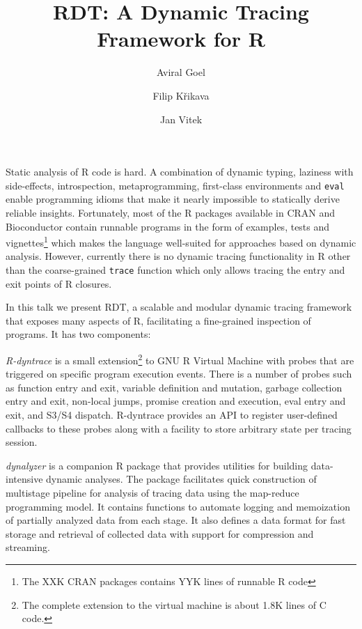 \documentclass[acmsmall,review]{acmart}
\title{RDT: A Dynamic Tracing Framework for R}
\author{Aviral Goel}
\affiliation{
  \institution{Northeastern University}
  \country{USA}
}
\author{Filip Křikava}
\affiliation{
  \institution{Czech Technical University}
  \country{Czechia}
}
\author{Jan Vitek}
\affiliation{
  \institution{Northeastern University}
  \country{USA}
}
\affiliation{
  \institution{Czech Technical University}
  \country{Czechia}
}
\newcommand{\code}[1]{\lstinline|#1|\xspace}
\newcommand{\RDT}{RDT\xspace}
\newcommand{\RDyntrace}{R-dyntrace\xspace}
\newcommand{\dynalyzer}{dynalyzer\xspace}
\begin{document}
\maketitle

\vspace{-1mm}

Static analysis of R code is hard. A combination of dynamic typing, laziness
with side-effects, introspection, metaprogramming, first-class environments and
\code{eval} enable programming idioms that make it nearly impossible to
statically derive reliable insights. Fortunately, most of the R packages
available in CRAN and Bioconductor contain runnable programs in the form of
examples, tests and vignettes\footnote{The XXK CRAN packages contains YYK lines
of runnable R code} which makes the language well-suited for approaches based on
dynamic analysis.
%
However, currently there is no dynamic tracing functionality in R other than the
coarse-grained \code{trace} function which only allows tracing the entry and exit
points of R closures.

In this talk we present \RDT, a scalable and modular dynamic tracing framework
that exposes many aspects of R, facilitating a fine-grained inspection of
programs. It has two components:
%
\begin{compactitem}[$-$]
\item \emph{\RDyntrace} is a small extension\footnote{The complete extension to
  the virtual machine is about 1.8K lines of C code.} to GNU R Virtual Machine
  with probes that are triggered on specific program execution events. There is
  a number of probes such as function entry and exit, variable definition and
  mutation, garbage collection entry and exit, non-local jumps, promise
  creation and execution, eval entry and exit, and S3/S4 dispatch. \RDyntrace
  provides an API to register user-defined callbacks to these probes along with
  a facility to store arbitrary state per tracing session.
\item \emph{\dynalyzer} is a companion R package that provides utilities for
  building data-intensive dynamic analyses. The package facilitates quick
  construction of multistage pipeline for analysis of tracing data using the
  map-reduce programming model. It contains functions to automate logging and
  memoization of partially analyzed data from each stage. It also defines a
  data format for fast storage and retrieval of collected data with support for
  compression and streaming.
\end{compactitem}
\end{document}
